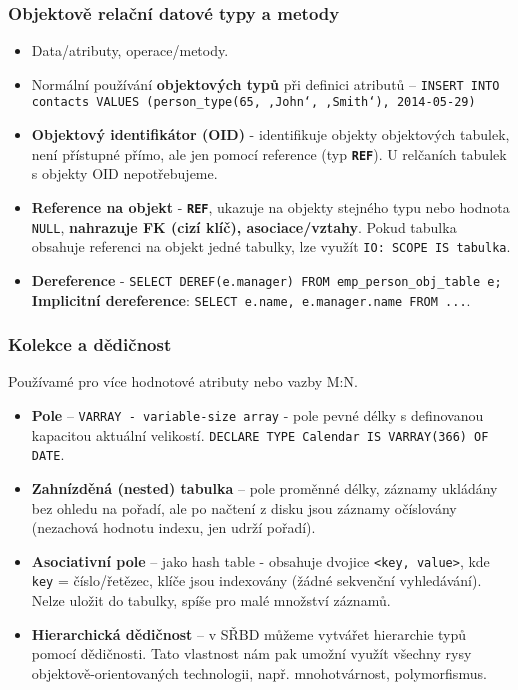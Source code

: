 \subsubsection{Objektově relační datové typy a metody}
\begin{itemize}
\item Data/atributy, operace/metody.
\item Normální používání \textbf{objektových typů} při definici atributů -- \texttt{INSERT INTO contacts VALUES (person\_type(65, ‚John‘, ‚Smith‘), 2014-05-29)}
\item \textbf{Objektový identifikátor (OID)} - identifikuje objekty objektových tabulek, není přístupné přímo, ale jen pomocí reference (typ \texttt{\textbf{REF}}). U relčaních tabulek s objekty OID nepotřebujeme.
\item \textbf{Reference na objekt} - \texttt{\textbf{REF}}, ukazuje na objekty stejného typu nebo hodnota \texttt{NULL}, \textbf{nahrazuje FK (cizí klíč), asociace/vztahy}. Pokud tabulka obsahuje referenci na objekt jedné tabulky, lze využít \texttt{IO: SCOPE IS tabulka}.
\item \textbf{Dereference} - \texttt{SELECT DEREF(e.manager) FROM emp\_person\_obj\_table e;}  \textbf{Implicitní dereference}: \texttt{SELECT e.name, e.manager.name FROM ...}.
\end{itemize}

\subsubsection{Kolekce a dědičnost}
Používamé pro více hodnotové atributy nebo vazby M:N.
\begin{itemize}
\item \textbf{Pole} -- \texttt{VARRAY - variable-size array} - pole pevné délky s definovanou kapacitou aktuální velikostí. \texttt{DECLARE TYPE Calendar IS VARRAY(366) OF DATE}.
\item \textbf{Zahnízděná (nested) tabulka} -- pole proměnné délky, záznamy ukládány bez ohledu na pořadí, ale po načtení z disku jsou záznamy očíslovány (nezachová hodnotu indexu, jen udrží pořadí).
\item \textbf{Asociativní pole} -- jako hash table - obsahuje dvojice \texttt{<key, value>}, kde \texttt{key} = číslo/řetězec, klíče jsou indexovány (žádné sekvenční vyhledávání). Nelze uložit do tabulky, spíše pro malé množství záznamů.
\item \textbf{Hierarchická dědičnost} -- v SŘBD můžeme vytvářet hierarchie typů pomocí dědičnosti. Tato vlastnost nám pak umožní využít všechny rysy objektově-orientovaných technologii, např. mnohotvárnost, polymorfismus.
\end{itemize}

